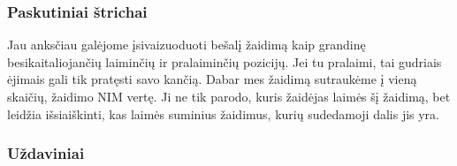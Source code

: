 \subsubsection{Paskutiniai štrichai}

Jau anksčiau galėjome įsivaizuoduoti bešalį žaidimą kaip grandinę
besikaitaliojančių laiminčių ir pralaiminčių pozicijų. Jei tu pralaimi, tai
gudriais ėjimais gali tik pratęsti savo kančią. Dabar mes žaidimą sutraukėme į
vieną skaičių, žaidimo NIM vertę. Ji ne tik parodo, kuris žaidėjas laimės šį žaidimą, bet leidžia išsiaiškinti, kas laimės suminius žaidimus, kurių sudedamoji dalis jis yra. 

\subsubsection{Uždaviniai}


